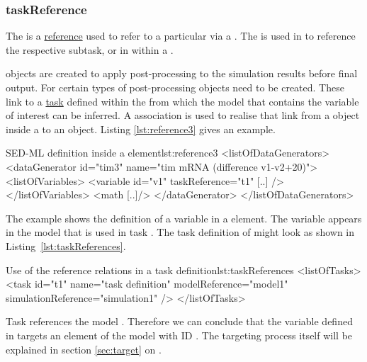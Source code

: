 \subsubsection{taskReference}
\label{sec:taskReference}
The  is a \hyperref[sec:reference]{reference} used to refer to a particular \AbstractTask via a \SIdRef. The  is used in \SubTask to reference the respective subtask, or in \Variable within a \DataGenerator.

\DataGenerator objects are created to apply post-processing to the simulation results before final output. 
For certain types of post-processing \Variable objects need to be created.
These link to a \hyperref[class:abstractTask]{task} defined within the \ListOfTasks from which the model that contains the variable of interest can be inferred. A  association is used to realise that link from a \Variable object inside a \DataGenerator to an \AbstractTask object. Listing \ref{lst:reference3} gives an example.

\begin{myXmlLst}{SED-ML  definition inside a  element}{lst:reference3}
<listOfDataGenerators>
	<dataGenerator id="tim3" name="tim mRNA (difference v1-v2+20)">
	<listOfVariables>
   		<variable id="v1" taskReference="t1" [..] />
  	</listOfVariables>
  	<math [..]/>
	</dataGenerator>
</listOfDataGenerators>
\end{myXmlLst}

The example shows the definition of a variable  in a  element. The variable appears in the model that is used in task . The task definition of  might look as shown in Listing~\ref{lst:taskReferences}.

\begin{myXmlLst}{Use of the reference relations in a task definition}{lst:taskReferences}
<listOfTasks>
	<task id="t1" name="task definition" modelReference="model1" simulationReference="simulation1" />
</listOfTasks>
\end{myXmlLst}
Task  references the model . Therefore we can conclude that the variable  defined in  targets an element of the model with ID . The targeting process itself will be explained in section \ref{sec:target} on .

